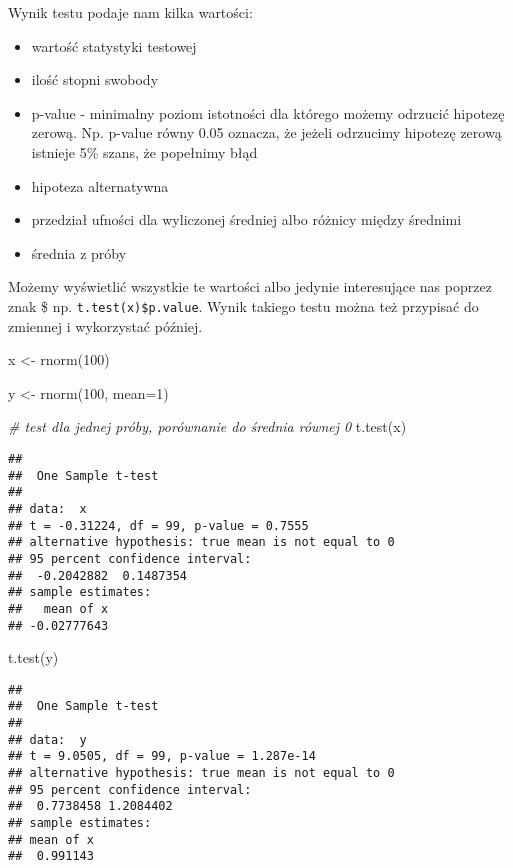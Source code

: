 \documentclass[
]{book}
\newenvironment{Shaded}{\begin{snugshade}}{\end{snugshade}}
\newcommand{\AttributeTok}[1]{\textcolor[rgb]{0.77,0.63,0.00}{#1}}
\newcommand{\CommentTok}[1]{\textcolor[rgb]{0.56,0.35,0.01}{\textit{#1}}}
\newcommand{\DecValTok}[1]{\textcolor[rgb]{0.00,0.00,0.81}{#1}}
\newcommand{\FunctionTok}[1]{\textcolor[rgb]{0.00,0.00,0.00}{#1}}
\newcommand{\NormalTok}[1]{#1}
\newcommand{\OtherTok}[1]{\textcolor[rgb]{0.56,0.35,0.01}{#1}}
\begin{document}
Wynik testu podaje nam kilka wartości:

\begin{itemize}
\item
  wartość statystyki testowej
\item
  ilość stopni swobody
\item
  p-value - minimalny poziom istotności dla którego możemy odrzucić hipotezę zerową. Np. p-value równy 0.05 oznacza, że jeżeli odrzucimy hipotezę zerową istnieje 5\% szans, że popełnimy błąd
\item
  hipoteza alternatywna
\item
  przedział ufności dla wyliczonej średniej albo różnicy między średnimi
\item
  średnia z próby
\end{itemize}

Możemy wyświetlić wszystkie te wartości albo jedynie interesujące nas poprzez znak \$ np. \texttt{t.test(x)\$p.value}. Wynik takiego testu można też przypisać do zmiennej i wykorzystać później.

\begin{Shaded}
\begin{Highlighting}[]
\NormalTok{x }\OtherTok{\textless{}{-}} \FunctionTok{rnorm}\NormalTok{(}\DecValTok{100}\NormalTok{)}

\NormalTok{y }\OtherTok{\textless{}{-}} \FunctionTok{rnorm}\NormalTok{(}\DecValTok{100}\NormalTok{, }\AttributeTok{mean=}\DecValTok{1}\NormalTok{)}

\CommentTok{\# test dla jednej próby, porównanie do średnia równej 0}
\FunctionTok{t.test}\NormalTok{(x)}
\end{Highlighting}
\end{Shaded}

\begin{verbatim}
## 
##  One Sample t-test
## 
## data:  x
## t = -0.31224, df = 99, p-value = 0.7555
## alternative hypothesis: true mean is not equal to 0
## 95 percent confidence interval:
##  -0.2042882  0.1487354
## sample estimates:
##   mean of x 
## -0.02777643
\end{verbatim}

\begin{Shaded}
\begin{Highlighting}[]
\FunctionTok{t.test}\NormalTok{(y)}
\end{Highlighting}
\end{Shaded}

\begin{verbatim}
## 
##  One Sample t-test
## 
## data:  y
## t = 9.0505, df = 99, p-value = 1.287e-14
## alternative hypothesis: true mean is not equal to 0
## 95 percent confidence interval:
##  0.7738458 1.2084402
## sample estimates:
## mean of x 
##  0.991143
\end{verbatim}
\end{document}
